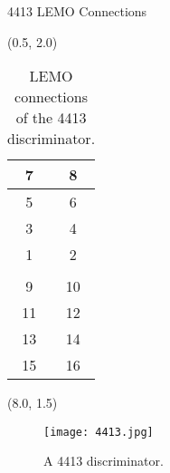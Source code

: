 \documentclass[10pt, xcolor={dvipsnames}, aspectratio = 169, sans,mathserif]{beamer}
\begin{document}
\begin{frame}{4413 LEMO Connections}

\begin{textblock}{7.0}(0.5, 2.0)
\begin{table}
\begin{center}
\begin{tabular}{ | c | c |}
\hline
7 & 8 \\
\hline
5 & 6 \\
\hline
3 & 4 \\
\hline
1 & 2 \\
\hline
 & \\
\hline
9 & 10 \\
\hline
11 & 12 \\
\hline
13 & 14 \\
\hline
15 & 16 \\
\hline
\end{tabular}
\caption{LEMO connections of the 4413 discriminator.}
\end{center}
\end{table}
\end{textblock}

\begin{textblock}{7.0}(8.0, 1.5)
\begin{figure}
    \centering
    \texttt{[image: 4413.jpg]}
    \caption{A 4413 discriminator.}
\end{figure}
\end{textblock}

\end{frame}
\end{document}

